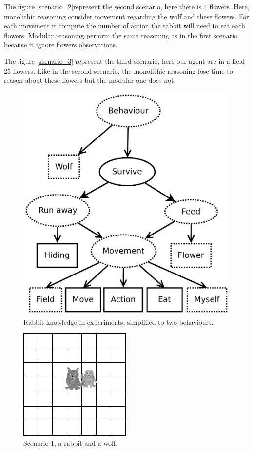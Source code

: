 \documentclass{aamas2012}
\begin{document}
	The figure \ref{scenario_2}represent the second scenario, here there is 4 flowers.
	Here, monolithic reasoning consider movement regarding the wolf and these flowers.
	For each movement it compute the number of action the rabbit will need to eat each flowers.
	Modular reasoning perform the same reasoning as in the first scenario because it ignore flowers observations.
	
	The figure \ref{scenario_3} represent the third scenario, here our agent are in a field 25 flowers.
	Like in the second scenario, the monolithic reasoning lose time to reason about these flowers but the modular one does not.
	
	\begin{figure}
		\centering
		\includegraphics[keepaspectratio=true, scale=0.4]{modular_knowledge_experiment.pdf}
		\caption
		{
			\label{modular_knowledge_experiment}
			Rabbit knowledge in experiments, simplified to two behaviours.
		}
	\end{figure}
	
	\begin{figure}
		\centering
		\includegraphics[keepaspectratio=true, scale=0.5]{scenario_1.png}
		\caption
		{
			\label{scenario_1}
			Scenario 1, a rabbit and a wolf.
		}
	\end{figure}
\end{document}
